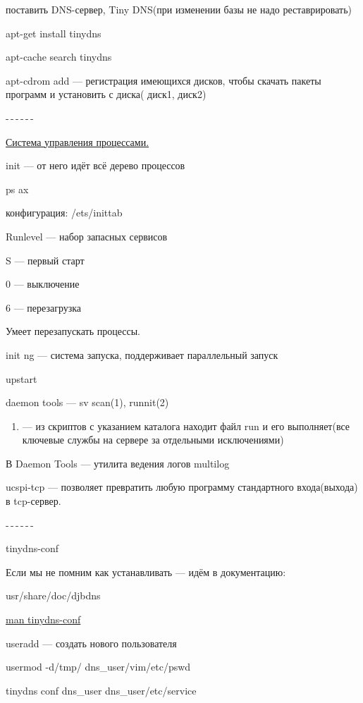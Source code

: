 \par 
поставить DNS-сервер, Tiny DNS(при изменении
базы не надо реставрировать)
\par 
apt-get install tinydns
\par 
apt-cache search tinydns
\par 
apt-cdrom add — регистрация имеющихся дисков,
чтобы скачать пакеты программ и установить
с диска( диск1, диск2)
\par 
-$\,$-$\,$-$\,$-$\,$-$\,$-
\par 
\underline{Система управления процессами.}
\par 
init — от него идёт всё дерево процессов
\par 
ps ax
\par 
конфигурация: /ets/inittab
\par 
Runlevel — набор запасных сервисов
\par 
S — первый старт
\par 
0 — выключение
\par 
6 — перезагрузка
\par 
Умеет перезапускать процессы.
\par 
init ng — система запуска, поддерживает
параллельный запуск
\par 
upstart
\par 
daemon tools — sv scan(1), runnit(2)
\begin{enumerate}
	\item \par —
	из
	скриптов с указанием каталога находит
	файл run и его выполняет(все ключевые
	службы на сервере за отдельными
	исключениями)
\end{enumerate}
\par 
В Daemon Tools — утилита ведения логов multilog
\par 
ucspi-tcp — позволяет превратить любую
программу стандартного входа(выхода)
в tcp-сервер.
\par 
-$\,$-$\,$-$\,$-$\,$-$\,$-
\par 
tinydns-conf
\par 
Если мы не помним как устанавливать —
идём в документацию:
\par 
usr/share/doc/djbdns
\par 
\underline{man tinydns-conf}
\par 
useradd — создать нового пользователя  

\par 
usermod -d/tmp/ dns\_user/vim/etc/pswd
\par 
tinydns conf dns\_user dns\_user/etc/service 

